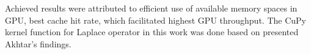 \vspace{0.2cm}


Achieved results were attributed to efficient use of available memory spaces in GPU, best cache hit rate, which facilitated highest GPU throughput. The CuPy kernel function for Laplace operator in this work was done based on presented Akhtar's findings.